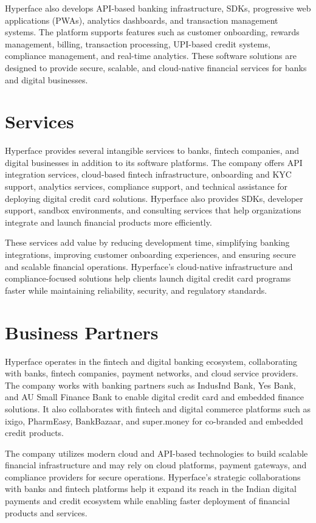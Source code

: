Hyperface also develops API-based banking infrastructure, SDKs, progressive web applications (PWAs), analytics dashboards, and transaction management systems. The platform supports features such as customer onboarding, rewards management, billing, transaction processing, UPI-based credit systems, compliance management, and real-time analytics. These software solutions are designed to provide secure, scalable, and cloud-native financial services for banks and digital businesses.

\section{Services}
Hyperface provides several intangible services to banks, fintech companies, and digital businesses in addition to its software platforms. The company offers API integration services, cloud-based fintech infrastructure, onboarding and KYC support, analytics services, compliance support, and technical assistance for deploying digital credit card solutions. Hyperface also provides SDKs, developer support, sandbox environments, and consulting services that help organizations integrate and launch financial products more efficiently.

These services add value by reducing development time, simplifying banking integrations, improving customer onboarding experiences, and ensuring secure and scalable financial operations. Hyperface's cloud-native infrastructure and compliance-focused solutions help clients launch digital credit card programs faster while maintaining reliability, security, and regulatory standards.

\section{Business Partners}
Hyperface operates in the fintech and digital banking ecosystem, collaborating with banks, fintech companies, payment networks, and cloud service providers. The company works with banking partners such as IndusInd Bank, Yes Bank, and AU Small Finance Bank to enable digital credit card and embedded finance solutions. It also collaborates with fintech and digital commerce platforms such as ixigo, PharmEasy, BankBazaar, and super.money for co-branded and embedded credit products.

The company utilizes modern cloud and API-based technologies to build scalable financial infrastructure and may rely on cloud platforms, payment gateways, and compliance providers for secure operations. Hyperface's strategic collaborations with banks and fintech platforms help it expand its reach in the Indian digital payments and credit ecosystem while enabling faster deployment of financial products and services.

